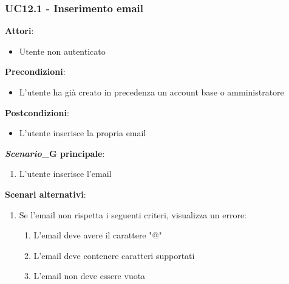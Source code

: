 \subsubsection{UC12.1 - Inserimento email} \label{usecase:12_1}
\textbf{Attori}:
\begin{itemize}
    \item Utente non autenticato
\end{itemize}
\textbf{Precondizioni}:
\begin{itemize}
    \item L'utente ha già creato in precedenza un account base o amministratore
\end{itemize}
\textbf{Postcondizioni}:
\begin{itemize}
    \item L'utente inserisce la propria email
\end{itemize}
\textbf{\textit{Scenario}_G principale}:
\begin{enumerate}
    \item L'utente inserisce l'email
\end{enumerate}
\textbf{Scenari alternativi}:
\begin{enumerate}
    \item Se l'email non rispetta i seguenti criteri, visualizza un errore:
    \begin{enumerate}
        \item L'email deve avere il carattere "@"
        \item L'email deve contenere caratteri supportati
        \item L'email non deve essere vuota
    \end{enumerate}
\end{enumerate}